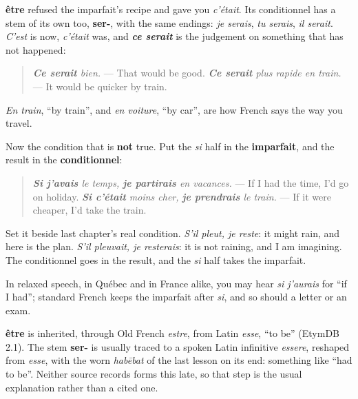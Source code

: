 \textbf{être} refused the imparfait's recipe and gave you \emph{c'était}. Its conditionnel has a stem of its own too, \textbf{ser-}, with the same endings: \emph{je serais}, \emph{tu serais}, \emph{il serait}. \emph{C'est} is now, \emph{c'était} was, and \emph{\textbf{ce serait}} is the judgement on something that has not happened:

\begin{quote}
\emph{\textbf{Ce serait} bien.} — That would be good. \emph{\textbf{Ce serait} plus rapide en train.} — It would be quicker by train.
\end{quote}

\emph{En train}, \textquotedblleft{}by train\textquotedblright{}, and \emph{en voiture}, \textquotedblleft{}by car\textquotedblright{}, are how French says the way you travel.

\begin{grammarlens}[title={Grammar Lens: si, the imparfait, and the would}]
Now the condition that is \textbf{not} true. Put the \emph{si} half in the \textbf{imparfait}, and the result in the \textbf{conditionnel}:

\begin{quote}
\emph{\textbf{Si j'avais} le temps, \textbf{je partirais} en vacances.} — If I had the time, I'd go on holiday. \emph{\textbf{Si c'était} moins cher, \textbf{je prendrais} le train.} — If it were cheaper, I'd take the train.
\end{quote}

Set it beside last chapter's real condition. \emph{S'il pleut, je reste}: it might rain, and here is the plan. \emph{S'il pleuvait, je resterais}: it is not raining, and I am imagining. The conditionnel goes in the result, and the \emph{si} half takes the imparfait.

In relaxed speech, in Québec and in France alike, you may hear \emph{si j'aurais} for \textquotedblleft{}if I had\textquotedblright{}; standard French keeps the imparfait after \emph{si}, and so should a letter or an exam.
\end{grammarlens}

\begin{cousinweb}
\textbf{être} is inherited, through Old French \emph{estre}, from Latin \emph{esse}, \textquotedblleft{}to be\textquotedblright{} (EtymDB 2.1). The stem \textbf{ser-} is usually traced to a spoken Latin infinitive \emph{essere}, reshaped from \emph{esse}, with the worn \emph{habēbat} of the last lesson on its end: something like \textquotedblleft{}had to be\textquotedblright{}. Neither source records forms this late, so that step is the usual explanation rather than a cited one.
\end{cousinweb}

